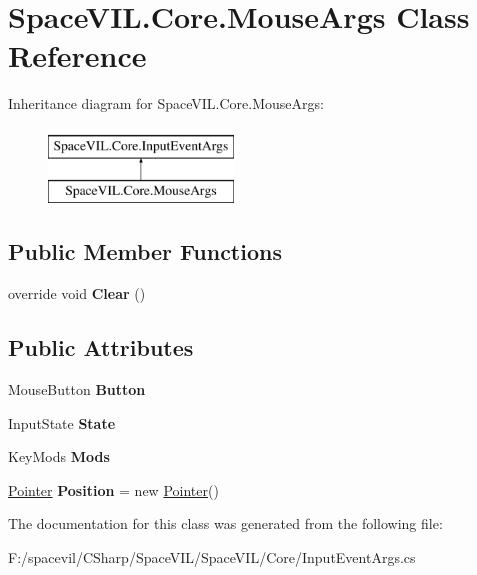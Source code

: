 \hypertarget{class_space_v_i_l_1_1_core_1_1_mouse_args}{}\section{Space\+V\+I\+L.\+Core.\+Mouse\+Args Class Reference}
\label{class_space_v_i_l_1_1_core_1_1_mouse_args}
Inheritance diagram for Space\+V\+I\+L.\+Core.\+Mouse\+Args\+:\begin{figure}[H]
\begin{center}
\leavevmode
\includegraphics[height=2.000000cm]{class_space_v_i_l_1_1_core_1_1_mouse_args}
\end{center}
\end{figure}
\subsection*{Public Member Functions}
\begin{DoxyCompactItemize}
\item 
\mbox{\label{class_space_v_i_l_1_1_core_1_1_mouse_args_a5cfcaa3655f01b0aab43bc6904f37b79}} 
override void {\bfseries Clear} ()
\end{DoxyCompactItemize}
\subsection*{Public Attributes}
\begin{DoxyCompactItemize}
\item 
\mbox{\label{class_space_v_i_l_1_1_core_1_1_mouse_args_af319bfab5c281eb6500b6a9817d58960}} 
Mouse\+Button {\bfseries Button}
\item 
\mbox{\label{class_space_v_i_l_1_1_core_1_1_mouse_args_a3f4854e5ff400b7c9c9db431ccfbae0a}} 
Input\+State {\bfseries State}
\item 
\mbox{\label{class_space_v_i_l_1_1_core_1_1_mouse_args_a581f3c72b6e296a10208fb0965c1be8c}} 
Key\+Mods {\bfseries Mods}
\item 
\mbox{\label{class_space_v_i_l_1_1_core_1_1_mouse_args_aa90d315915d577763e4296448c8b344d}} 
\mbox{\hyperlink{class_space_v_i_l_1_1_core_1_1_pointer}{Pointer}} {\bfseries Position} = new \mbox{\hyperlink{class_space_v_i_l_1_1_core_1_1_pointer}{Pointer}}()
\end{DoxyCompactItemize}


The documentation for this class was generated from the following file\+:\begin{DoxyCompactItemize}
\item 
F\+:/spacevil/\+C\+Sharp/\+Space\+V\+I\+L/\+Space\+V\+I\+L/\+Core/Input\+Event\+Args.\+cs\end{DoxyCompactItemize}
